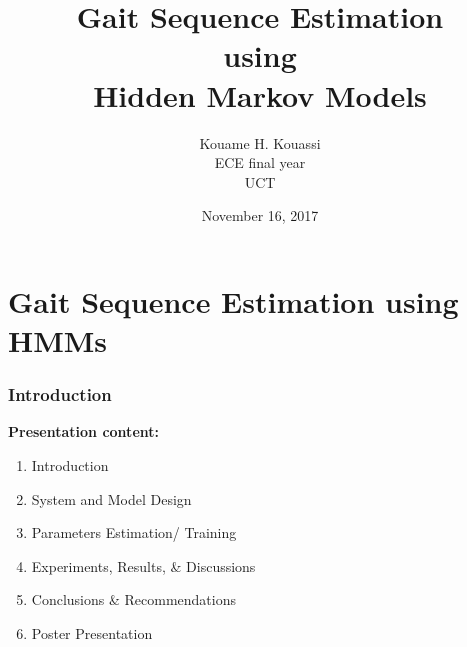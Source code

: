 \documentclass[serif,mathserif]{beamer}
\author[Kouame Kouassi]{Kouame H. Kouassi\\ \quad ECE final year\\ \quad UCT}
\title[Gait Estimation\hspace{2em}\insertframenumber/\inserttotalframenumber]{Gait Sequence Estimation \\using \\Hidden Markov Models}
\date{November 16, 2017} %
\institute{Final year project presentation}
\begin{document}
\maketitle


\section{Gait Sequence Estimation using HMMs}
\begin{frame}
  \frametitle{Introduction}
  \textbf{Presentation content:}\pause
  \begin{enumerate}
  \item Introduction
  \newline
  \item System and Model Design
  \newline
  \item Parameters Estimation/ Training %
  \newline
  \item Experiments, Results, \& Discussions
  \newline
  \item Conclusions \& Recommendations
  \newline
  \item Poster Presentation  
  \end{enumerate}
\end{frame}

\end{document}
